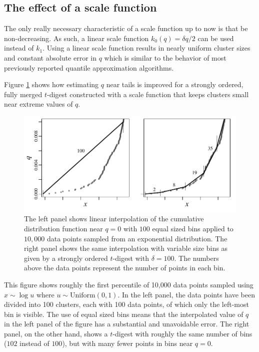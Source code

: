 \documentclass[]{statsoc}
\begin{document}
\subsection{The effect of a scale function}

The only really necessary characteristic of a scale function up to now is that be non-decreasing. As such,  a linear scale function $k_0(q) = \delta q/2$ can be used instead of  $k_1$. Using a linear scale function results in nearly uniform cluster sizes and constant absolute error in $q$  which is similar to the behavior of most previously reported quantile approximation algorithms. 

Figure \ref{fig:linear-interpolation} shows how  estimating $q$ near tails is improved for a strongly ordered, fully merged $t$-digest constructed with a scale function that keeps clusters small near extreme values of $q$. 
\begin{figure}[htb] %
   \centering
   \includegraphics[height=2.in, clip]{figures/linear-interpolation.pdf} 
   \caption{The left panel shows linear interpolation of the cumulative distribution function near $q=0$ with $100$ equal sized bins applied to $10,000$ data points sampled from an exponential distribution. The right panel shows the same interpolation with variable size bins as given by a strongly ordered $t$-digest with $\delta=100$. The numbers above the data points represent the number of points in each bin. }
   \label{fig:linear-interpolation}
\end{figure}
This figure shows roughly the first percentile of 10,000 data points sampled using $x \sim \log u$ where $u \sim \mathrm{Uniform}(0,1)$. In the left panel, the data points have been divided into 100 clusters, each with 100 data points, of which only the left-most bin is visible. The use of equal sized bins means that the interpolated value of $q$ in the left panel of the figure has a substantial and unavoidable error. The right panel, on the other hand, shows a $t$-digest with roughly the same number of bins ($102$ instead of $100$), but with many fewer points in bins near  $q=0$. 
\end{document}
